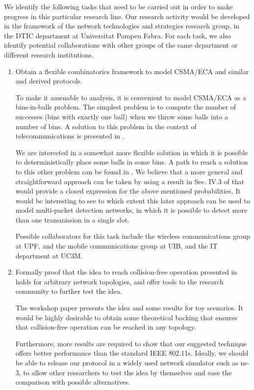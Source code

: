 \documentclass[a4paper,twocolumns]{article}%
\begin{document}
We identify the following tasks that need to be carried out in order to make progress in this particular research line.
Our research activity would be developed in the framework of the network technologies and strategies research group, in the DTIC department at Universitat Pompeu Fabra.
For each task, we also identify potential collaborations with other groups of the same department or different research institutions.
\begin{enumerate}
  \item Obtain a flexible combinatorics framework to model CSMA/ECA and similar and derived protocols.

To make it amenable to analysis, it is convenient to model CSMA/ECA as a bins-in-balls problem.
The simplest problem is to compute the number of successes (bins with exactly one ball) when we throw some balls into a number of bins.
A solution to this problem in the context of telecommunications is presented in \cite{szpankowski1983asc}.

We are interested in a somewhat more flexible solution in which it is possible to deterministically place some balls in some bins.
A path to reach a solution to this other problem can be found in \cite{he2009sbr}.
We believe that a more general and straightforward approach can be taken by using a result in Sec. IV.3 of \cite{feller1968ipt} that would provide a closed expression for the above mentioned probabilities.
It would be interesting to see to which extent this later approach can be used to model multi-packet detection networks, in which it is possible to detect more than one transmission in a single slot.

Possible collaborators for this task include the wireless communications group at UPF, and the mobile communications group at UIB, and the IT department at UC3M.

  \item Formally proof that the idea to reach collision-free operation presented in \cite{barcelo2011cfo} holds for arbitrary network topologies, and offer tools to the research community to further test the idea.

The workshop paper presents the idea and some results for toy scenarios.
It would be highly desirable to obtain some theoretical backing that ensures that collision-free operation can be reached in any topology.

Furthermore, more results are required to show that our suggested technique offers better performance than the standard IEEE 802.11s.
Ideally, we should be able to release our protocol in a widely used network simulator such as ns-3, to allow other researchers to test the idea by themselves and ease the comparison with possible alternatives.


\end{enumerate}
\end{document}
